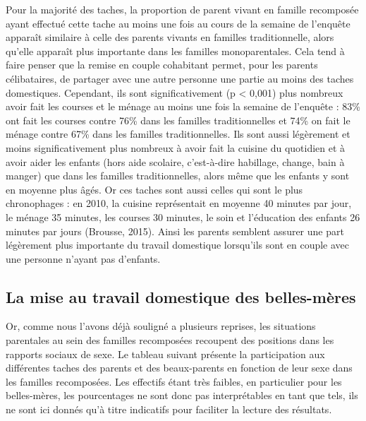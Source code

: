 \documentclass[
  12pt,
]{book}
\begin{document}
Pour la majorité des taches, la proportion de parent vivant en famille
recomposée ayant effectué cette tache au moins une fois au cours de la
semaine de l'enquête apparaît similaire à celle des parents vivants en
familles traditionnelle, alors qu'elle apparaît plus importante dans les
familles monoparentales. Cela tend à faire penser que la remise en
couple cohabitant permet, pour les parents célibataires, de partager
avec une autre personne une partie au moins des taches domestiques.
Cependant, ils sont significativement (p \textless{} 0,001) plus
nombreux avoir fait les courses et le ménage au moins une fois la
semaine de l'enquête : 83\% ont fait les courses contre 76\% dans les
familles traditionnelles et 74\% on fait le ménage contre 67\% dans les
familles traditionnelles. Ils sont aussi légèrement et moins
significativement plus nombreux à avoir fait la cuisine du quotidien et
à avoir aider les enfants (hors aide scolaire, c'est-à-dire habillage,
change, bain à manger) que dans les familles traditionnelles, alors même
que les enfants y sont en moyenne plus âgés. Or ces taches sont aussi
celles qui sont le plus chronophages : en 2010, la cuisine représentait
en moyenne 40 minutes par jour, le ménage 35 minutes, les courses 30
minutes, le soin et l'éducation des enfants 26 minutes par jours
(Brousse, 2015). Ainsi les parents semblent assurer une part légèrement
plus importante du travail domestique lorsqu'ils sont en couple avec une
personne n'ayant pas d'enfants.

\subsection{La mise au travail domestique des
belles-mères}\label{la-mise-au-travail-domestique-des-belles-muxe8res}

Or, comme nous l'avons déjà souligné a plusieurs reprises, les
situations parentales au sein des familles recomposées recoupent des
positions dans les rapports sociaux de sexe. Le tableau suivant présente
la participation aux différentes taches des parents et des beaux-parents
en fonction de leur sexe dans les familles recomposées. Les effectifs
étant très faibles, en particulier pour les belles-mères, les
pourcentages ne sont donc pas interprétables en tant que tels, ils ne
sont ici donnés qu'à titre indicatifs pour faciliter la lecture des
résultats.

\begingroup\fontsize{7}{9}\selectfont
\begingroup\fontsize{8}{10}\selectfont
\end{document}
